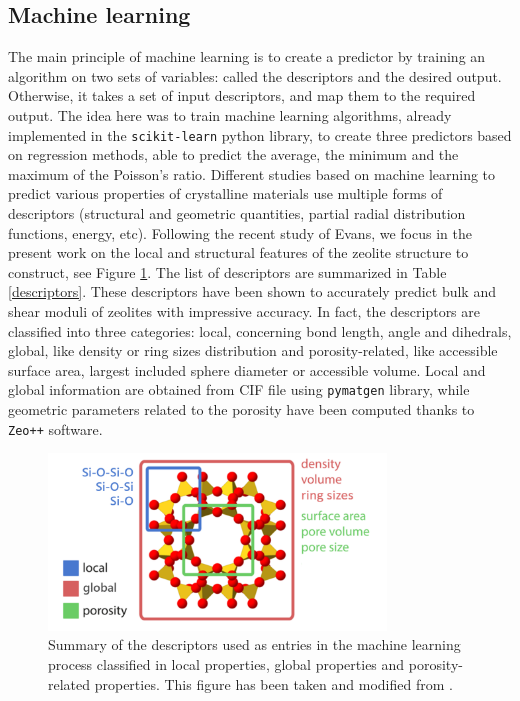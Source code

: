 \documentclass[journal=jacsat,manuscript=article]{achemso}
\begin{document}
\subsection{Machine learning}
The main principle of machine learning is to create a predictor by training an algorithm on two sets of variables: called the descriptors and the desired output. Otherwise, it takes a set of input descriptors, and map them to the required output. The idea here was to train machine learning algorithms, already implemented in the \texttt{scikit-learn} python library\cite{Pedregosa:2011:SML:1953048.2078195}, to create three predictors based on regression methods, able to predict the average, the minimum and the maximum of the Poisson's ratio. Different studies based on machine learning to predict various properties of crystalline materials use multiple forms of descriptors (structural and geometric quantities, partial radial distribution functions, energy, etc).\cite{Fernandez2014, deJong2016} Following the recent study of Evans\cite{Evans2017}, we focus in the present work on the local and structural features of the zeolite structure to construct, see Figure \ref{ML}. The list of descriptors are summarized in Table \ref{descriptors}. These descriptors have been shown to accurately predict bulk and shear moduli of zeolites with impressive accuracy.\cite{Evans2017} In fact, the descriptors are classified into three categories: local, concerning bond length, angle and dihedrals, global, like density or ring sizes distribution and porosity-related, like accessible surface area, largest included sphere diameter or accessible volume. Local and global information are obtained from CIF file using \texttt{pymatgen} library,\cite{Ong2013} while geometric parameters related to the porosity have been computed thanks to \texttt{Zeo++} software.\cite{Willems2012, Martin2011} 
			
\begin{figure}[H]\centering
\includegraphics[clip,trim=0cm 0cm 0cm 0cm,width=0.80\textwidth]{zeolite_study_7}
\caption{Summary of the descriptors used as entries in the machine learning process classified in local properties, global properties and porosity-related properties. This figure has been taken and modified from \cite{Evans2017}.
\label{ML}}
\end{figure}
\end{document}
